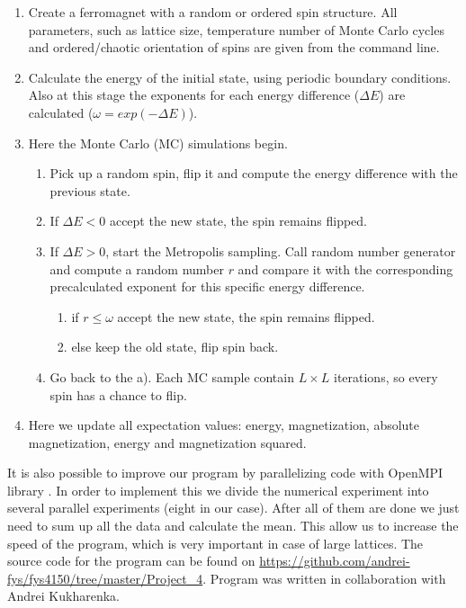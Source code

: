 \documentclass[a4paper]{article}
\begin{document}
\begin{enumerate}
\item
Create a ferromagnet with a random or ordered spin structure. All parameters, such as lattice size, temperature number of Monte Carlo cycles and ordered/chaotic orientation of spins are given from the command line.
\item
Calculate the energy of the initial state, using periodic boundary conditions. Also at this stage the exponents for each energy difference ($\Delta E$) are calculated ($\omega= exp(-\Delta E)$).
\item
Here the Monte Carlo (MC) simulations begin. \\
\begin{enumerate}
\item Pick up a random spin, flip it and compute the energy difference with the previous state. 
\item 
If $\Delta E < 0$ accept the new state, the spin remains flipped. 
\item 
If $\Delta E > 0$, start the Metropolis sampling. Call random number generator and compute a random number $r$ and compare it with the corresponding precalculated exponent for this specific energy difference.
\begin{enumerate}
\item if $r \leq \omega$ accept the new state, the spin remains flipped.
\item else keep the old state, flip spin back.
\end{enumerate}
\item Go back to the a). Each MC sample contain ${L\times L}$ iterations, so every spin has a chance to flip.
\end{enumerate}
\item Here we update all expectation values: energy, magnetization, absolute magnetization, energy and magnetization squared.
\end{enumerate}

It is also possible to improve our program by parallelizing code with OpenMPI library \cite{four}.  In order to implement this we divide the numerical experiment into several parallel experiments (eight in our case). After all of them are done we just need to sum up all the data and calculate the mean. This allow us to increase the speed of the program, which is very important in case of large lattices.
The source code for the program can be found on \url{https://github.com/andrei-fys/fys4150/tree/master/Project_4}. Program was written in collaboration with Andrei Kukharenka.
\end{document}
